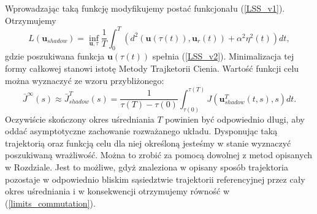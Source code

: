 \documentclass[12pt]{article}
\begin{document}
Wprowadzając taką funkcję modyfikujemy postać funkcjonału (\ref{LSS_v1}). Otrzymujemy
\begin{equation}
L(\textbf{u}_{shadow}) = \inf_{\textbf{u},\tau}\frac{1}{T}\int_{0}^{T}(d^{2}(\textbf{u}(\tau(t)),\textbf{u}_r(t)) + \alpha^{2}\eta^{2}(t))dt,
\label{LSS_v3}
\end{equation}
gdzie poszukiwana funkcja $ \textbf{u}(\tau(t)) $ spełnia (\ref{LSS_v2}). Minimalizacja tej formy całkowej stanowi istotę Metody Trajketorii Cienia.\newline
Wartość funkcji celu można wyznaczyć ze wzoru przybliżonego:
\begin{equation}
\bar{J}^{\infty}(s) \approx \bar{J}^{T}_{shadow}(s) = \frac{1}{\tau(T) - \tau(0)}\int_{\tau(0)}^{\tau(T)}J(\textbf{u}^{T}_{shadow}(t,s),s)dt.
\label{LSS_v4}
\end{equation}
Oczywiście skończony okres uśredniania $ T $ powinien być odpowiednio długi, aby oddać asymptotyczne zachowanie rozważanego układu. \newline
Dysponując taką trajektorią oraz funkcją celu dla niej określoną jesteśmy w stanie wyznaczyć poszukiwaną wrażliwość. Można to zrobić za pomocą dowolnej z metod opisanych w Rozdziale. Jest to możliwe, gdyż znaleziona w opisany sposób trajektoria pozostaje w odpowiednio bliskim sąsiedztwie trajektorii referencyjnej przez cały okres uśredniania i w konsekwencji otrzymujemy równość w (\ref{limits_commutation}).
\end{document}

